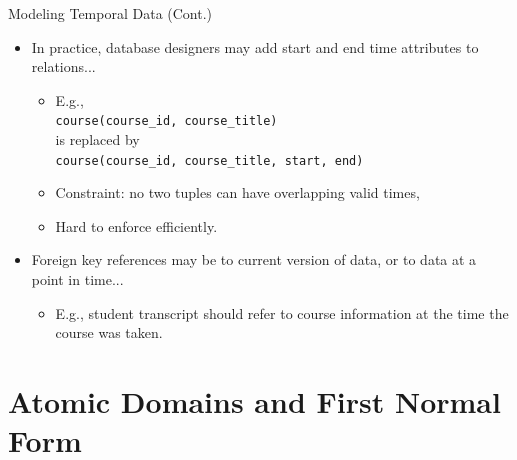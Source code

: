 \documentclass{beamer}
\begin{document}
\begin{frame}{Modeling Temporal Data (Cont.)}
    \begin{itemize}
        \footnotesize
        \item In practice, database designers may add start and end time attributes to relations...
            \begin{itemize}
                \footnotesize
                \item E.g., \\
                        \quad \texttt{course(course\_id, course\_title)} \\
                    is replaced by \\
                        \quad \texttt{course(course\_id, course\_title, start, end)}
                \item Constraint: no two tuples can have overlapping valid times,
                \item Hard to enforce efficiently.
            \end{itemize}
        \item Foreign key references may be to current version of data, or to data at a point in time...
            \begin{itemize}
                \footnotesize
                \item E.g., student transcript should refer to course information at the time the course was taken.
            \end{itemize}
    \end{itemize}
\end{frame}

\section{Atomic Domains and First Normal Form}
\end{document}
